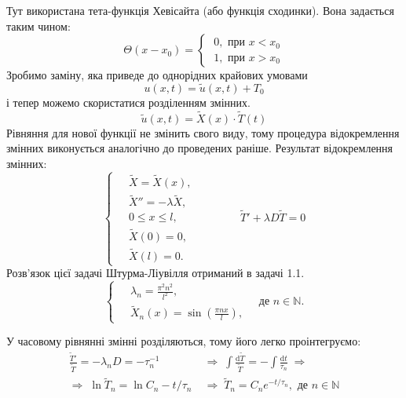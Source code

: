 \documentclass[a4paper, 14pt]{extreport}
\begin{document}
Тут використана тета-функція Хевісайта (або функція сходинки). Вона задається таким чином:
\begin{equation*}
    \Theta(x - x_0) = 
    \begin{cases}
        \;0, \text{ при } x < x_0\\
        \;1, \text{ при } x > x_0
    \end{cases}    
\end{equation*}
Зробимо заміну, яка приведе до однорідних крайових умовами\[u(x,t) = \widetilde{u}(x,t) + T_0 \] і тепер можемо скористатися розділенням змінних.
\begin{equation}
    \widetilde{u}(x,t) = \widetilde{X}(x)\cdot\widetilde{T}(t) 
\end{equation}
Рівняння для нової функції не змінить свого виду, тому процедура відокремлення змінних виконується аналогічно до проведених раніше. Результат відокремлення змінних:
\begin{equation} 
    \left\{ \begin{aligned}
        \;&\widetilde{X} = \widetilde{X}(x), \\  &\widetilde{X}'' = -\lambda \widetilde{X}, \\ &0 \leq x \leq l, \\  &\widetilde{X}(0) = 0, \\ &\widetilde{X}(l) = 0. 
    \end{aligned} \right.
    \qquad\qquad
    \widetilde{T}' + \lambda D \widetilde{T} = 0
\end{equation}
Розв'язок цієї задачі Штурма-Ліувілля отриманий в задачі 1.1. %
\begin{equation} 
    \left\{ \begin{aligned}
        \;&\lambda_n = \frac{\pi^2 n^2}{l^2},\\ 
        &\widetilde{X}_n(x) = \sin\left(\frac{\pi n x}{l}\right),
    \end{aligned} \right.
    \quad \text{де } n \in \mathbb{N}.
\end{equation}

У часовому рівнянні змінні розділяються, тому його легко проінтегруємо:
\begin{equation}
    \begin{aligned}
        \frac{\widetilde{T}'}{\widetilde{T}} = -\lambda_n D = -\tau_n^{-1}
        \;&\Rightarrow\;
        \int \frac{\mathrm{d} \widetilde{T}}{\widetilde{T}} = - \int \frac{\mathrm{d} t}{\tau_n}
        \;\Rightarrow\\
        \Rightarrow\;
        \ln{\widetilde{T}_n} = \ln{C_n} - t/\tau_n
        \;&\Rightarrow\;
        \widetilde{T}_n = C_n e^{-t/\tau_n}, \text{ де } n \in \mathbb{N}
    \end{aligned}
\end{equation}
\end{document}
